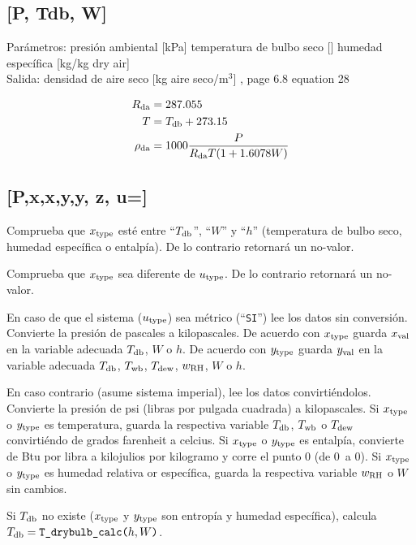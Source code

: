 \documentclass[letterpaper]{article}
\newcommand*\Tdb{\ensuremath{T\sub{db}}}
\newcommand*\Twb{\ensuremath{T\sub{wb}}}
\newcommand*\Tdp{\ensuremath{T\sub{dew}}}
\newcommand*\RH{\ensuremath{w\sub{RH}}}
\newcommand*\Rda{\ensuremath{\rho\sub{da}}}
\begin{document}
\subsection{[P, Tdb, W]}
\noindent Parámetros:
presión ambiental [kPa]
\vardef{\Tdb}temperatura de bulbo seco [\degC]
humedad específica [kg/kg dry air]
\\Salida:
\vardef{\Rda}densidad de aire seco [kg aire seco/$\text{m}^3$]
\ashref, page 6.8 equation 28

\begin{align}
	R\sub{da} &= 287.055 \\
	T &= \Tdb+273.15 \\
	\Rda &= 1000\frac{P}{R\sub{da}T(1+1.6078W)}
\end{align}

\newcommand\type{\sub{type}}
\newcommand\val{}
\subsection{[P,x\type,x\val,y\type,y\val, z\type, u\type=]}

Comprueba que $x\type$ esté entre ``$\Tdb$'', ``$W$'' y ``$h$'' (temperatura de bulbo seco, humedad específica o entalpía).
De lo contrario retornará un no-valor.

Comprueba que $x\type$ sea diferente de $u\type$.
De lo contrario retornará un no-valor.

En caso de que el sistema ($u\type$) sea métrico (``\texttt{SI}'') lee los datos sin conversión.
\tab Convierte la presión de pascales a kilopascales.
\tab De acuerdo con $x\type$ guarda $x\val$ en la variable adecuada $\Tdb$, $W$ o $h$.
\tab De acuerdo con $y\type$ guarda $y\val$ en la variable adecuada $\Tdb$, $\Twb$, $\Tdp$, $\RH$, $W$ o  $h$.

En caso contrario (asume sistema imperial), lee los datos convirtiéndolos.
\tab Convierte la presión de psi (libras por pulgada cuadrada) a kilopascales.
\tab Si $x\type$ o $y\type$ es temperatura, guarda la respectiva variable $\Tdb$, $\Twb$ o $\Tdp$ convirtiéndo de grados farenheit a celcius.
\tab Si $x\type$ o $y\type$ es entalpía, convierte de Btu por libra a kilojulios por kilogramo y corre el punto 0 (de 0\degF\ a 0\degC).
\tab Si $x\type$ o $y\type$ es humedad relativa or específica, guarda la respectiva variable $\RH$ o $W$ sin cambios.

Si $\Tdb$ no existe ($x\type$ y $y\type$ son entropía y humedad específica), calcula $\Tdb=\funcname{T\_drybulb\_calc}[h,W]$.
\end{document}
